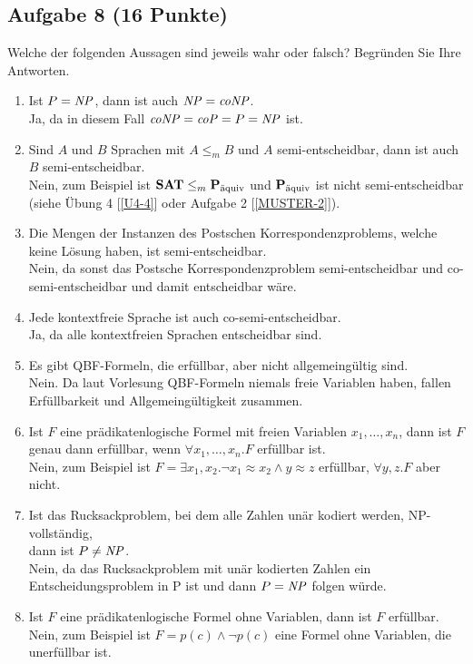 \subsection*{Aufgabe 8 (16 Punkte)}
    Welche der folgenden Aussagen sind jeweils wahr oder falsch? Begründen Sie Ihre Antworten.
    \begin{enumerate}
        \item Ist $P = \NP$, dann ist auch $\NP = \MT{coNP}$. \\
        \LOES Ja\POINT, da in diesem Fall $\MT{coNP} = \MT{coP} = P = \NP$ ist.\POINT

        \item Sind $A$ und $B$ Sprachen mit $A \leq_m B$ und $A$ semi-entscheidbar, dann ist auch $B$ semi-entscheidbar. \\
        \LOES Nein\POINT, zum Beispiel ist $\prob{SAT} \leq_m \paq$ und $\paq$ ist nicht semi-entscheidbar (siehe Übung 4 [\ref{U4-4}] oder Aufgabe 2 [\ref{MUSTER-2}]).\POINT

        \item Die Mengen der Instanzen des Postschen Korrespondenzproblems, welche keine Lösung haben, ist semi-entscheidbar. \\
        \LOES Nein\POINT, da sonst das Postsche Korrespondenzproblem semi-entscheidbar und co-semi-entscheidbar und damit entscheidbar wäre.\POINT

        \item Jede kontextfreie Sprache ist auch co-semi-entscheidbar. \\
        \LOES Ja\POINT, da alle kontextfreien Sprachen entscheidbar sind.\POINT

        \item Es gibt QBF-Formeln, die erfüllbar, aber nicht allgemeingültig sind. \\
        \LOES Nein\POINT. Da laut Vorlesung QBF-Formeln niemals freie Variablen haben, fallen Erfüllbarkeit und Allgemeingültigkeit zusammen.\POINT

        \item Ist $F$ eine prädikatenlogische Formel mit freien Variablen $x_1,\dots,x_n$, dann ist $F$ genau dann erfüllbar, wenn $\forall x_1,\dots,x_n.F$ erfüllbar ist. \\
        \LOES Nein\POINT, zum Beispiel ist $F = \exists x_1, x_2.\neg x_1 \approx x_2 \land y \approx z$ erfüllbar, $\forall y,z.F$ aber nicht.\POINT

        \item Ist das Rucksackproblem, bei dem alle Zahlen unär kodiert werden, NP-vollständig,\\
        dann ist $P \not= \NP$. \\
        \LOES Nein\POINT, da das Rucksackproblem mit unär kodierten Zahlen ein Entscheidungsproblem in P ist und dann $P = \NP$ folgen würde.\POINT

        \item Ist $F$ eine prädikatenlogische Formel ohne Variablen, dann ist $F$ erfüllbar. \\
        \LOES Nein\POINT, zum Beispiel ist $F = p(c) \land \neg p(c)$ eine Formel ohne Variablen, die unerfüllbar ist.\POINT
    \end{enumerate}
